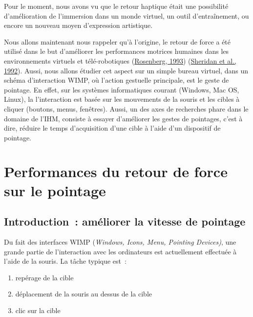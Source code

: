 \documentclass[
]{book}
\providecommand{\tightlist}{%
  \setlength{\itemsep}{0pt}\setlength{\parskip}{0pt}}
\begin{document}
Pour le moment, nous avons vu que le retour haptique était une possibilité
d'amélioration de l'immersion dans un monde virtuel, un outil d'entraînement,
ou encore un nouveau moyen d'expression artistique.

Nous allons maintenant nous rappeler qu'à l'origine, le retour de force a
été utilisé dans le but d'améliorer les performances motrices humaines dans
les environnements virtuels et télé-robotiques (\protect\hyperlink{ref-rosenberg1993virtual}{Rosenberg, 1993})
(\protect\hyperlink{ref-sheridan1992musings}{Sheridan et al., 1992}). Aussi, nous allons étudier cet
aspect sur un simple bureau virtuel, dans un schéma d'interaction WIMP, où
l'action gestuelle principale, est le geste de pointage. En effet, sur les
systèmes informatiques courant (Windows, Mac OS, Linux), la l'interaction est
basée sur les mouvements de la souris et les cibles à cliquer (boutons,
menus, fenêtres). Aussi, un des axes de recherches phare dans le domaine de
l'IHM, consiste à essayer d'améliorer les gestes de pointages, c'est à dire,
réduire le temps d'acquisition d'une cible à l'aide d'un dispositif de
pointage.

\hypertarget{performances-du-retour-de-force-sur-le-pointage}{%
\chapter{Performances du retour de force sur le pointage}\label{performances-du-retour-de-force-sur-le-pointage}}

\hypertarget{introduction-amuxe9liorer-la-vitesse-de-pointage}{%
\section{Introduction~: améliorer la vitesse de pointage}\label{introduction-amuxe9liorer-la-vitesse-de-pointage}}

Du fait des interfaces WIMP (\emph{Windows, Icons, Menu, Pointing
Devices)}, une grande partie de l'interaction avec les ordinateurs est
actuellement effectuée à l'aide de la souris. La tâche typique est~:

\begin{enumerate}
\def\labelenumi{\arabic{enumi}.}
\tightlist
\item
  repérage de la cible
\item
  déplacement de la souris au dessus de la cible
\item
  clic sur la cible
\end{enumerate}
\end{document}
